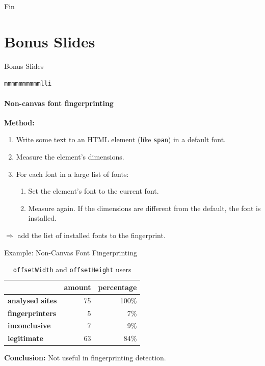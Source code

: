 \documentclass[t]{beamer}
\begin{document}
\begin{frame}[plain]
    \vspace{3.5cm}
    \centering \Large Fin
\end{frame}

\section*{Bonus Slides}
\begin{frame}[plain]
    \vspace{3.5cm}
    \centering \Large Bonus Slides
\end{frame}

\begin{frame}{\texttt{mmmmmmmmmmlli}}
    \framesubtitle{Non-canvas font fingerprinting}

    \pause

    \textbf{Method:}
    \begin{enumerate}
        \item Write some text to an HTML element (like \texttt{span}) in a default font.
        \pause
        \item Measure the element's dimensions.
        \pause
        \item For each font in a large list of fonts:
            \begin{enumerate}
                \item Set the element's font to the current font.
                \item Measure again. If the dimensions are different from the default, the font is installed.
            \end{enumerate}
    \end{enumerate}

    \pause

    \vspace{1cm}
    $\Rightarrow$ add the list of installed fonts to the fingerprint.
\end{frame}

\begin{frame}{Example: Non-Canvas Font Fingerprinting}
    \begin{table}
        \centering
        \caption{\texttt{offsetWidth} and \texttt{offsetHeight} users}
        \begin{tabular}{l r r}
            \toprule
            & amount & percentage \\
            \midrule
            \textbf{analysed sites} & 75 & 100\% \\
            \midrule
            \textbf{fingerprinters} & 5 & 7\% \\
            \textbf{inconclusive} & 7 & 9\% \\
            \textbf{legitimate} & 63 & 84\% \\
            \bottomrule
        \end{tabular}
    \end{table}

    \vspace{0.5cm}

    \pause
    \textbf{Conclusion:} Not useful in fingerprinting detection.
\end{frame}
\end{document}
